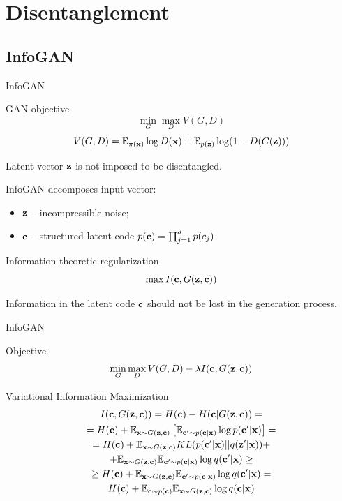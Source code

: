 \section{Disentanglement}
\subsection{InfoGAN}
\begin{frame}{InfoGAN}
	\begin{block}{GAN objective}
		\vspace{-0.6cm}
		\[
		\min_{G} \max_D V(G, D)
		\]
		\[
		V(G, D)  =  \mathbb{E}_{\pi(\mathbf{x})} \log D(\mathbf{x}) + \mathbb{E}_{p(\mathbf{z})} \log (1 - D(G(\mathbf{z})))
		\]
	\end{block}
	Latent vector $\mathbf{z}$ is not imposed to be disentangled.
	
	InfoGAN decomposes input vector:
	\begin{itemize}
		\item $\mathbf{z}$ -- incompressible noise;
		\item $\mathbf{c}$ -- structured latent code $p(\mathbf{c}) = \prod_{j=1}^d p(c_j)$.
	\end{itemize}
	\begin{block}{Information-theoretic regularization}
		\vspace{-0.3cm}
		\[
		\max I (\mathbf{c}, G(\mathbf{z}, \mathbf{c}))
		\]
	\end{block}
	Information in the latent code $\mathbf{c}$ should not be lost in the generation process.
\end{frame}
\begin{frame}{InfoGAN}
	\begin{block}{Objective}
		\vspace{-0.3cm}
		\[
		\min_{G} \max_D V(G, D) - \lambda I (\mathbf{c}, G(\mathbf{z}, \mathbf{c}))
		\]
	\end{block}
	\begin{block}{Variational Information Maximization}
		\vspace{-0.3cm}
		\begin{multline*}
			I (\mathbf{c}, G(\mathbf{z}, \mathbf{c})) = H(\mathbf{c}) - H(\mathbf{c} | G(\mathbf{z}, \mathbf{c})) = \\
			= H(\mathbf{c}) + \mathbb{E}_{\mathbf{x} \sim G(\mathbf{z}, \mathbf{c})} \left[ \mathbb{E}_{\mathbf{c}' \sim p(\mathbf{c} | \mathbf{x})} \log p(\mathbf{c}' | \mathbf{x}) \right] = \\ 
			= H(\mathbf{c}) + \mathbb{E}_{\mathbf{x} \sim G(\mathbf{z}, \mathbf{c})} KL(p(\mathbf{c}'| \mathbf{x}) || q(\mathbf{z}' | \mathbf{x})) + 
			\\ + \mathbb{E}_{\mathbf{x} \sim G(\mathbf{z}, \mathbf{c})}  \mathbb{E}_{\mathbf{c}' \sim p(\mathbf{c} | \mathbf{x})} \log q(\mathbf{c}' | \mathbf{x})  \geq\\
			\geq H(\mathbf{c}) + \mathbb{E}_{\mathbf{x} \sim G(\mathbf{z}, \mathbf{c})} \mathbb{E}_{\mathbf{c}' \sim p(\mathbf{c} | \mathbf{x})} \log q(\mathbf{c}' | \mathbf{x}) = \\
			H(\mathbf{c}) + \mathbb{E}_{\mathbf{c} \sim p(\mathbf{c})} \mathbb{E}_{\mathbf{x} \sim G(\mathbf{z}, \mathbf{c})} \log q(\mathbf{c} | \mathbf{x})
		\end{multline*}
	\end{block}
\end{frame}
